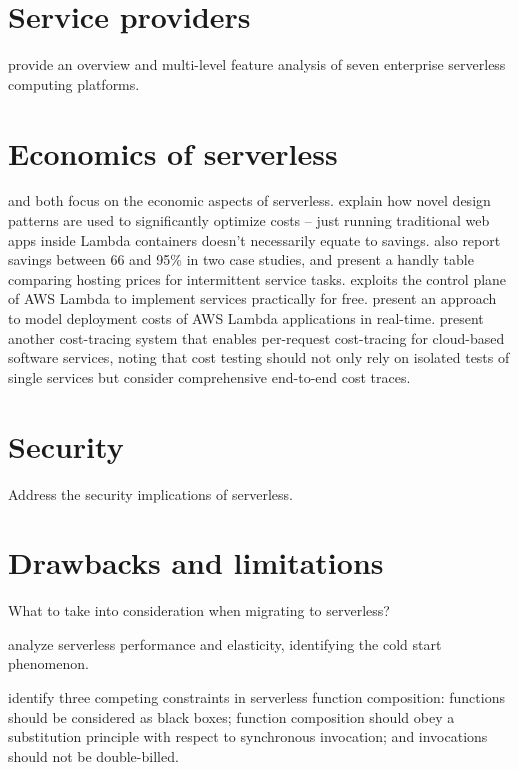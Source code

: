 \documentclass[utf8,english]{gradu3}
\begin{document}
\section{Service providers}

\textcite{lynn2017preliminary} provide an overview and multi-level feature analysis of seven enterprise serverless computing platforms.

\section{Economics of serverless}

\textcite{eivy2017wary} and \textcite{villamizar2016infrastructure} both focus on the economic aspects of serverless. \textcite{adzic2017serverless} explain how novel design patterns are used to significantly optimize costs -- just running traditional web apps inside Lambda containers doesn't necessarily equate to savings. \textcite{adzic2017serverless} also report savings between 66 and 95\% in two case studies, and present a handly table comparing hosting prices for intermittent service tasks. \textcite{spillner17exploiting} exploits the control plane of AWS Lambda to implement services practically for free. \textcite{leitner16modelcost} present an approach to model deployment costs of AWS Lambda applications in real-time. \textcite{kuhlenkamp17costradamus} present another cost-tracing system that enables per-request cost-tracing for cloud-based software services, noting that cost testing should not only rely on isolated tests of single services but consider comprehensive end-to-end cost traces.

\section{Security}

Address the security implications of serverless.

\section{Drawbacks and limitations}

What to take into consideration when migrating to serverless?

\textcite{lloydserverless} analyze serverless performance and elasticity, identifying the cold start phenomenon.

\textcite{baldini17trilemma} identify three competing constraints in serverless function composition: functions should be considered as black boxes; function composition should obey a substitution principle with respect to synchronous invocation; and invocations should not be double-billed.
\end{document}
